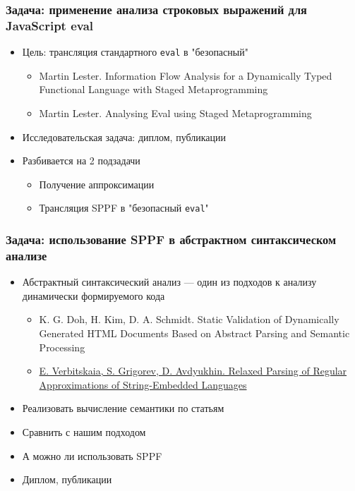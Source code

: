 \documentclass{beamer}
\begin{document}
\begin{frame}[fragile]
  \transwipe[direction=90]
  \frametitle{Задача: применение анализа строковых выражений для JavaScript eval}
  \begin{itemize}
    \item Цель: трансляция стандартного \texttt{eval} в "безопасный"
    \begin{itemize}
        \item Martin Lester. Information Flow Analysis for a Dynamically Typed Functional Language with Staged Metaprogramming
        \item Martin Lester. Analysing Eval using Staged Metaprogramming
    \end{itemize} 
    \item Исследовательская задача: диплом, публикации
    \item Разбивается на 2 подзадачи
    \begin{itemize}
        \item Получение аппроксимации
        \item Трансляция SPPF в "безопасный \texttt{eval}"        
    \end{itemize} 
  \end{itemize}
\end{frame}

\begin{frame}
  \transwipe[direction=90]
  \frametitle{Задача: использование SPPF в абстрактном синтаксическом анализе}
  \begin{itemize}
    \item Абстрактный синтаксический анализ --- один из подходов к анализу динамически формируемого кода
    \begin{itemize}
        \item K. G. Doh, H. Kim, D. A. Schmidt. Static Validation of Dynamically Generated HTML Documents Based on Abstract Parsing and Semantic Processing
        \item \href{https://github.com/YaccConstructor/articles/blob/master/2015/PSI/paper/psi_2015.pdf}{E. Verbitskaia, S. Grigorev, D. Avdyukhin. Relaxed Parsing of Regular Approximations of String-Embedded Languages}
    \end{itemize} 
    \item Реализовать вычисление семантики по статьям
    \item Сравнить с нашим подходом
    \item А можно ли использовать SPPF
    \item Диплом, публикации
  \end{itemize}
\end{frame}
\end{document}
